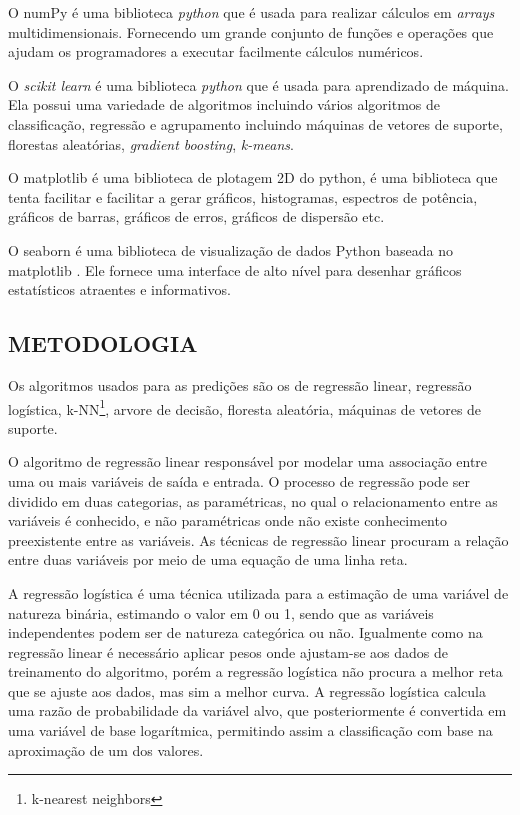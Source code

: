 O numPy é uma biblioteca \textit{python} que é usada para realizar cálculos em \textit{arrays} multidimensionais. Fornecendo um grande conjunto de funções e operações que ajudam os programadores a executar facilmente cálculos numéricos.\cite{numpy}

O \textit{scikit learn} é uma biblioteca \textit{python} que é usada para aprendizado de máquina. Ela possui uma variedade de algoritmos incluindo vários algoritmos de classificação, regressão e agrupamento incluindo máquinas de vetores de suporte, florestas aleatórias, \textit{gradient boosting}, \textit{k-means}\cite{scikit}.

O matplotlib é uma biblioteca de plotagem 2D do python, é uma biblioteca que tenta facilitar e facilitar a gerar gráficos, histogramas, espectros de potência, gráficos de barras, gráficos de erros, gráficos de dispersão etc\cite{matplotlib}.

O seaborn é uma biblioteca de visualização de dados Python baseada no matplotlib . Ele fornece uma interface de alto nível para desenhar gráficos estatísticos atraentes e informativos.\cite{seaborn}


\subsection{METODOLOGIA}
Os algoritmos usados para as predições são os de regressão linear, regressão logística, k-NN\footnote{k-nearest neighbors},  arvore de decisão, floresta aleatória, máquinas de vetores de suporte.

O algoritmo de regressão linear responsável por modelar uma associação entre uma ou mais variáveis de saída e entrada. O processo de regressão pode ser dividido em duas categorias, as paramétricas, no qual o relacionamento entre as variáveis é conhecido, e não paramétricas onde não existe conhecimento preexistente entre as variáveis. As técnicas de regressão linear procuram a relação entre duas variáveis por meio de uma equação de uma linha reta\cite{Bogoni2019}.

A regressão logística é uma técnica utilizada para a estimação de uma variável de natureza binária, estimando o valor em 0 ou 1, sendo que as variáveis independentes podem ser de natureza categórica ou não. Igualmente como na regressão linear é
necessário aplicar pesos onde ajustam-se aos dados de treinamento do algoritmo, porém a regressão logística não procura a melhor reta que se ajuste aos dados, mas sim a melhor curva. A regressão logística calcula uma razão de probabilidade da variável alvo, que posteriormente é convertida em uma variável de base logarítmica, permitindo assim a classificação com base na aproximação de um dos valores\cite{Witten2011}.

